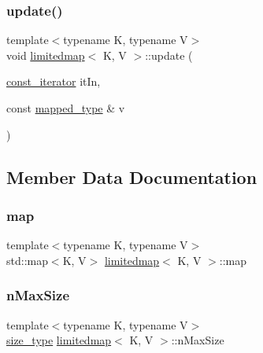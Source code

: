 \mbox{\label{classlimitedmap_af29154e7161f1deeea268d0dcea464ab}} 
\subsubsection{\texorpdfstring{update()}{update()}}
{\footnotesize\ttfamily template$<$typename K, typename V$>$ \\
void \mbox{\hyperlink{classlimitedmap}{limitedmap}}$<$ K, V $>$\+::update (\begin{DoxyParamCaption}\item[{\mbox{\hyperlink{classlimitedmap_ab0a3e4f2ec7c82359300c83a35ae2500}{const\+\_\+iterator}}}]{it\+In,  }\item[{const \mbox{\hyperlink{classlimitedmap_a8bd6b8e7f91f0a141c91c382b492c03c}{mapped\+\_\+type}} \&}]{v }\end{DoxyParamCaption})\hspace{0.3cm}{\ttfamily [inline]}}



\subsection{Member Data Documentation}
\mbox{\label{classlimitedmap_a66e668a5286b7b82061c6867548897a0}} 
\subsubsection{\texorpdfstring{map}{map}}
{\footnotesize\ttfamily template$<$typename K, typename V$>$ \\
std\+::map$<$K, V$>$ \mbox{\hyperlink{classlimitedmap}{limitedmap}}$<$ K, V $>$\+::map\hspace{0.3cm}{\ttfamily [protected]}}

\mbox{\label{classlimitedmap_a3ff20a34a489085042060796d44a644e}} 
\subsubsection{\texorpdfstring{n\+Max\+Size}{nMaxSize}}
{\footnotesize\ttfamily template$<$typename K, typename V$>$ \\
\mbox{\hyperlink{classlimitedmap_a1c564b323f94e182e56aa27975e5f9d1}{size\+\_\+type}} \mbox{\hyperlink{classlimitedmap}{limitedmap}}$<$ K, V $>$\+::n\+Max\+Size\hspace{0.3cm}{\ttfamily [protected]}}

